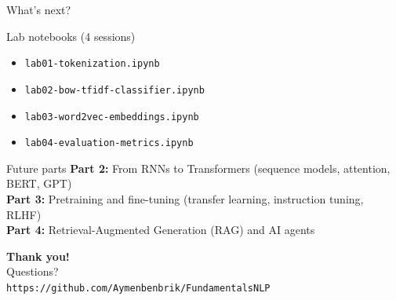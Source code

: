 \documentclass[11pt,aspectratio=169]{beamer}
\begin{document}
\begin{frame}{What's next?}
\begin{block}{Lab notebooks (4 sessions)}
\begin{itemize}
    \item \texttt{lab01-tokenization.ipynb}
    \item \texttt{lab02-bow-tfidf-classifier.ipynb}
    \item \texttt{lab03-word2vec-embeddings.ipynb}
    \item \texttt{lab04-evaluation-metrics.ipynb}
\end{itemize}
\end{block}
\vfill
\begin{block}{Future parts}
\textbf{Part 2:} From RNNs to Transformers (sequence models, attention, BERT, GPT)\\
\textbf{Part 3:} Pretraining and fine-tuning (transfer learning, instruction tuning, RLHF)\\
\textbf{Part 4:} Retrieval-Augmented Generation (RAG) and AI agents
\end{block}
\end{frame}

\begin{frame}
\centering
\Huge \textbf{Thank you!}\\[1em]
\large Questions?\\[1em]
\normalsize \texttt{https://github.com/Aymenbenbrik/FundamentalsNLP}
\end{frame}
\end{document}
